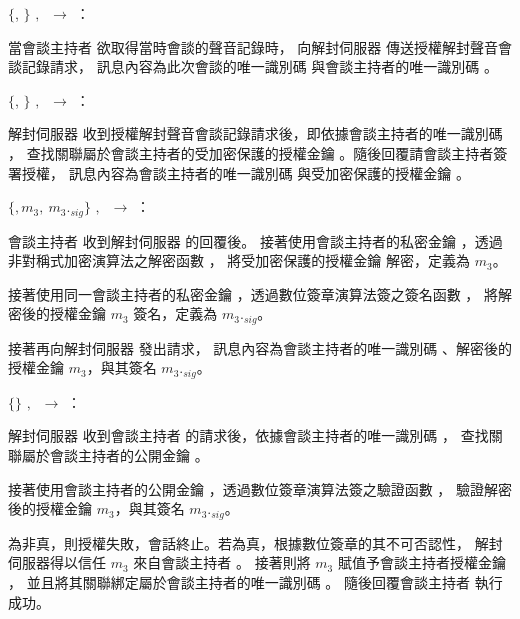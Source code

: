 \begin{pmsgsi}
    \item $\{$\DEFsessionID, \DEFownerID$\}$ $,~$  \DEFowner $\rightarrow$ \DEFserver：

        當會談主持者 \DEFowner 欲取得當時會談的聲音記錄時，
    向解封伺服器 \DEFserver 傳送授權解封聲音會談記錄請求，
    訊息內容為此次會談的唯一識別碼 \DEFsessionID 與會談主持者的唯一識別碼 \DEFownerID。

    \item $\{$\DEFownerID, \DEFakEnc$\}$ $,~$  \DEFserver $\rightarrow$ \DEFowner：

        解封伺服器 \DEFserver 收到授權解封聲音會談記錄請求後，即依據會談主持者的唯一識別碼 \DEFownerID，
    查找關聯屬於會談主持者的受加密保護的授權金鑰 \DEFakEnc。隨後回覆請會談主持者簽署授權，
    訊息內容為會談主持者的唯一識別碼 \DEFownerID 與受加密保護的授權金鑰 \DEFakEnc。

    \item $\{$\DEFownerID$, m_{3}, ~m_{3}._{sig}\}$ $,~$  \DEFowner $\rightarrow$ \DEFserver：

        會談主持者 \DEFowner 收到解封伺服器 \DEFserver 的回覆後。
    接著使用會談主持者的私密金鑰 \DEFprivateKey，透過非對稱式加密演算法之解密函數 \DEFfuncDecSK{}，
    將受加密保護的授權金鑰 \DEFakEnc 解密，定義為 $m_{3}$。

        接著使用同一會談主持者的私密金鑰 \DEFprivateKey，透過數位簽章演算法簽之簽名函數 \DEFfuncSignSK{}，
    將解密後的授權金鑰 $m_{3}$ 簽名，定義為 $m_{3}._{sig}$。

        接著再向解封伺服器 \DEFserver 發出請求，
    訊息內容為會談主持者的唯一識別碼 \DEFownerID、解密後的授權金鑰 $m_{3}$，與其簽名 $m_{3}._{sig}$。


    \item $\{\}$ $,~$ \DEFserver $\rightarrow$ \DEFowner：

        解封伺服器 \DEFserver 收到會談主持者 \DEFowner 的請求後，依據會談主持者的唯一識別碼 \DEFownerID，
    查找關聯屬於會談主持者的公開金鑰 \DEFpublicKey。

        接著使用會談主持者的公開金鑰 \DEFpublicKey，透過數位簽章演算法簽之驗證函數 \DEFfuncVerfPK{}，
    驗證解密後的授權金鑰 $m_{3}$，與其簽名 $m_{3}._{sig}$。

        為非真，則授權失敗，會話終止。若為真，根據數位簽章的其不可否認性，
    解封伺服器得以信任 $m_{3}$ 來自會談主持者 \DEFowner。
    接著則將 $m_{3}$ 賦值予會談主持者授權金鑰 \DEFagentKey，
    並且將其關聯綁定屬於會談主持者的唯一識別碼 \DEFownerID。
    隨後回覆會談主持者 \DEFowner 執行成功。
\end{pmsgsi}


